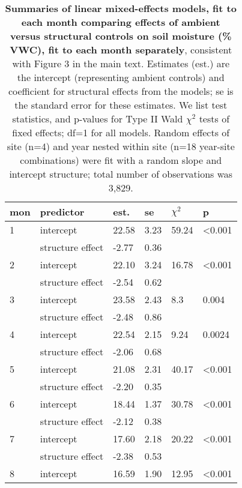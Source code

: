 \documentclass{article}
\begin{document}
\begin{table}[ht]
\centering
\caption{\textbf{Summaries of linear mixed-effects models, fit to each month comparing effects of ambient versus structural controls on soil moisture (\% VWC), fit to each month separately}, consistent with Figure 3 in the main text. Estimates (est.) are the intercept (representing ambient controls) and coefficient for structural effects from the models; se is the standard error for these estimates. We list test statistics, and p-values for Type II Wald $\chi^{2}$ tests of fixed effects; df=1 for all models. Random effects of site (n=4) and year nested within site (n=18 year-site combinations) were fit with a random slope and intercept structure; total number of observations was 3,829.} 
\label{table:shamamb_soilmoism}
\begingroup\footnotesize
\begin{tabular}{|p{}|p{}p{}p{}p{}p{}|}
  \hline
mon & predictor & est. & se & $\chi^2$ & p \\ 
  \hline
  1 & intercept & 22.58 & 3.23 & 59.24 & <0.001 \\ 
   & structure effect & -2.77 & 0.36 &  &  \\ 
   \hline
  2 & intercept & 22.10 & 3.24 & 16.78 & <0.001 \\ 
   & structure effect & -2.54 & 0.62 &  &  \\ 
   \hline
  3 & intercept & 23.58 & 2.43 & 8.3 & 0.004 \\ 
   & structure effect & -2.48 & 0.86 &  &  \\ 
   \hline
  4 & intercept & 22.54 & 2.15 & 9.24 & 0.0024 \\ 
   & structure effect & -2.06 & 0.68 &  &  \\ 
   \hline
  5 & intercept & 21.08 & 2.31 & 40.17 & <0.001 \\ 
   & structure effect & -2.20 & 0.35 &  &  \\ 
   \hline
  6 & intercept & 18.44 & 1.37 & 30.78 & <0.001 \\ 
   & structure effect & -2.12 & 0.38 &  &  \\ 
   \hline
  7 & intercept & 17.60 & 2.18 & 20.22 & <0.001 \\ 
   & structure effect & -2.38 & 0.53 &  &  \\ 
   \hline
  8 & intercept & 16.59 & 1.90 & 12.95 & <0.001 \\ 

\end{tabular}
\end{table}
\end{document}
